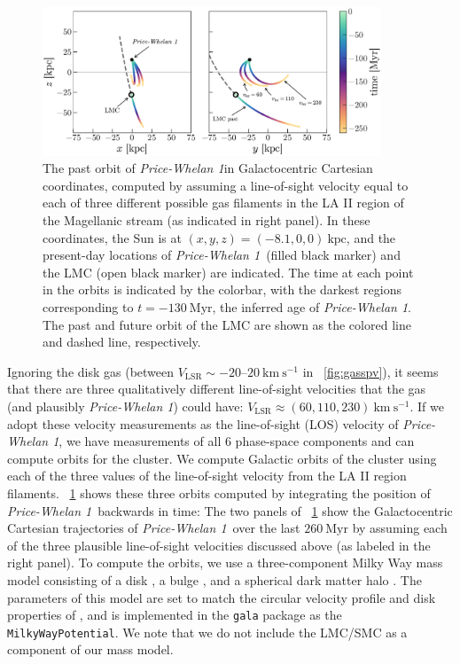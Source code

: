 \documentclass[twocolumn]{aastex62}
\newcommand{\kpc}{\textrm{kpc}}
\newcommand{\kms}{\ensuremath{\textrm{km}~\textrm{s}^{-1}}}
\newcommand{\clustername}{\textsl{Price-Whelan 1}}
\begin{document}
\begin{figure}[ht!]
\centering
\includegraphics[width=0.9\textwidth]{figures/orbits.pdf}
\caption{The past orbit of \clustername in Galactocentric Cartesian coordinates, computed by assuming a line-of-sight velocity equal to each of three different possible gas  filaments in the LA II region of the Magellanic stream (as indicated in right panel).
In these coordinates, the Sun is at $(x, y, z) = (-8.1, 0, 0)~\kpc$, and the present-day locations of \clustername\ (filled black marker) and the LMC (open black marker) are indicated.
The time at each point in the orbits is indicated by the colorbar, with the darkest regions corresponding to $t = -130~\textrm{Myr}$, the inferred age of \clustername.
The past and future orbit of the LMC are shown as the colored line and dashed line, respectively.
}
\label{fig:orbits}
\end{figure}

Ignoring the disk gas (between $V_{\textrm{LSR}} \sim -20$--$20~\kms$ in \figurename~\ref{fig:gasspv}), it seems that there are three qualitatively different line-of-sight velocities that the gas (and plausibly \clustername) could have: $V_{\textrm{LSR}} \approx (60, 110, 230)~\kms$.
If we adopt these velocity measurements as the line-of-sight (LOS) velocity of \clustername, we have measurements of all 6 phase-space components and can compute orbits for the cluster.
We compute Galactic orbits of the cluster using each of the three values of the line-of-sight velocity from the LA II region filaments.
\figurename~\ref{fig:orbits} shows these three orbits computed by integrating the position of \clustername\ backwards in time:
The two panels of \figurename~\ref{fig:orbits} show the Galactocentric Cartesian trajectories of \clustername\ over the last $260~\textrm{Myr}$ by assuming each of the three plausible line-of-sight velocities discussed above (as labeled in the right panel).
To compute the orbits, we use a three-component Milky Way mass model consisting of a disk \citep{Miyamoto:1975}, a bulge \citep{Hernquist:1990}, and a spherical dark matter halo \citep{Navarro:1996}.
The parameters of this model are set to match the circular velocity profile and disk properties of \citet{Bovy:2015}, and is implemented in the \texttt{gala} package \citep{gala} as the \texttt{MilkyWayPotential}.
We note that we do not include the LMC/SMC as a component of our mass model.
\end{document}
